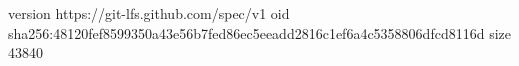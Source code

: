 version https://git-lfs.github.com/spec/v1
oid sha256:48120fef8599350a43e56b7fed86ec5eeadd2816c1ef6a4c5358806dfcd8116d
size 43840
